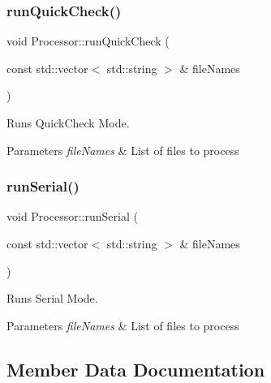 \subsubsection{\texorpdfstring{run\+Quick\+Check()}{runQuickCheck()}}
{\footnotesize\ttfamily void Processor\+::run\+Quick\+Check (\begin{DoxyParamCaption}\item[{const std\+::vector$<$ std\+::string $>$ \&}]{file\+Names }\end{DoxyParamCaption})\hspace{0.3cm}{\ttfamily [private]}}



Runs Quick\+Check Mode. 


\begin{DoxyParams}{Parameters}
{\em file\+Names} & List of files to process \\
\hline
\end{DoxyParams}
\mbox{\label{class_processor_a7475d40a755f8afa7b6746c7949454d9}} 
\subsubsection{\texorpdfstring{run\+Serial()}{runSerial()}}
{\footnotesize\ttfamily void Processor\+::run\+Serial (\begin{DoxyParamCaption}\item[{const std\+::vector$<$ std\+::string $>$ \&}]{file\+Names }\end{DoxyParamCaption})\hspace{0.3cm}{\ttfamily [private]}}



Runs Serial Mode. 


\begin{DoxyParams}{Parameters}
{\em file\+Names} & List of files to process \\
\hline
\end{DoxyParams}


\subsection{Member Data Documentation}
\mbox{\label{class_processor_a4f79251b6b5048bb3f4b3c0e67557766}} 

